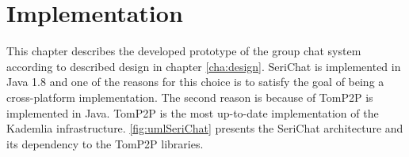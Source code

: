 \chapter{Implementation} \label{cha:implementation}
%
%
This chapter describes the developed prototype of the group chat system according to described design in chapter \ref{cha:design}.
SeriChat is implemented in Java 1.8 and one of the reasons for this choice is to satisfy the goal of being a cross-platform implementation. The second reason is because of TomP2P is implemented in Java. TomP2P is the most up-to-date implementation of the Kademlia infrastructure. \autoref{fig:umlSeriChat} presents the SeriChat architecture and its dependency to the TomP2P libraries.

